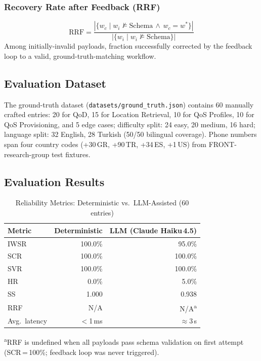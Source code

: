 \documentclass[conference]{IEEEtran}
\begin{document}
\subsubsection{Recovery Rate after Feedback (RRF)}
\begin{equation}
\text{RRF} = \frac{|\{w_c \mid w_i \not\models \text{Schema}
             \,\wedge\, w_c = w^*\}|}
             {|\{w_i \mid w_i \not\models \text{Schema}\}|}
\end{equation}
Among initially-invalid payloads, fraction successfully corrected
by the feedback loop to a valid, ground-truth-matching workflow.

\subsection{Evaluation Dataset}

The ground-truth dataset (\texttt{datasets/ground\_truth.json}) contains
60 manually crafted entries:
20 for QoD, 15 for Location Retrieval, 10 for QoS Profiles,
10 for QoS Provisioning, and 5 edge cases;
difficulty split: 24 easy, 20 medium, 16 hard;
language split: 32 English, 28 Turkish (50/50 bilingual coverage).
Phone numbers span four country codes (+30\,GR, +90\,TR, +34\,ES,
+1\,US) from FRONT-research-group test fixtures.

\subsection{Evaluation Results}

\begin{table}[H]
\centering
\caption{Reliability Metrics: Deterministic vs.\ LLM-Assisted (60 entries)}
\label{tab:results}
\small
\begin{tabular}{lrr}
\toprule
\textbf{Metric} & \textbf{Deterministic} & \textbf{LLM (Claude Haiku\,4.5)} \\
\midrule
IWSR  & 100.0\% & 95.0\% \\
SCR   & 100.0\% & 100.0\% \\
SVR   & 100.0\% & 100.0\% \\
HR    &   0.0\% &   5.0\% \\
SS    &   1.000 &   0.938 \\
RRF   &   N/A   &   N/A\textsuperscript{a} \\
Avg.\ latency & $<$1\,ms & $\approx$3\,s \\
\bottomrule
\end{tabular}

\vspace{2pt}
\noindent\footnotesize\textsuperscript{a}RRF is undefined when all
payloads pass schema validation on first attempt (SCR\,=\,100\%;
feedback loop was never triggered).
\end{table}
\end{document}
